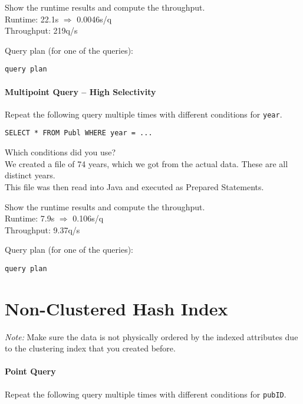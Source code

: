 \documentclass[11pt]{scrartcl}
\begin{document}
\smallskip\noindent
Show the runtime results and compute the throughput.\\
Runtime: 22.1s $\Rightarrow$ 0.0046s/q\\
Throughput: 219q/s

\smallskip\noindent
Query plan (for one of the queries):
{\small
\begin{verbatim}
query plan
\end{verbatim}
}


\paragraph{Multipoint Query -- High Selectivity}

Repeat the following query multiple times with different conditions for {\tt year}.

{\small
\begin{verbatim}
SELECT * FROM Publ WHERE year = ...
\end{verbatim}
}

\noindent
Which conditions did you use?\\
We created a file of 74 years, which we got from the actual data. These are all distinct years.\\
This file was then read into Java and executed as Prepared Statements.

\smallskip\noindent
Show the runtime results and compute the throughput.\\
Runtime: 7.9s $\Rightarrow$ 0.106s/q\\
Throughput: 9.37q/s

\smallskip\noindent
Query plan (for one of the queries):
{\small
\begin{verbatim}
query plan
\end{verbatim}
}

\section{Non-Clustered Hash Index}

\noindent \emph{Note:} Make sure the data is not physically ordered by
the indexed attributes due to the clustering index that you created
before.

\paragraph{Point Query}

Repeat the following query multiple times with different conditions for {\tt pubID}.
\end{document}

